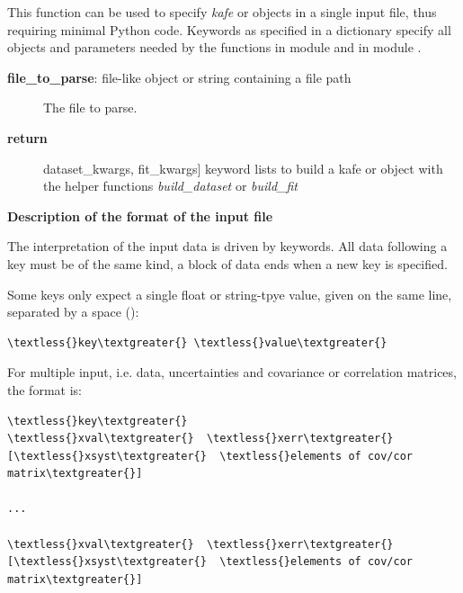 \documentclass[a4paper,10pt,english]{sphinxmanual}
\begin{document}
\begin{fulllineitems}
\label{index:kafe.file_tools.parse_general_inputfile}
This function can be used to specify \emph{kafe} 
or  objects in a single input file, thus requiring
minimal Python code. Keywords as specified in a dictionary
 specify all objects and parameters needed by the
functions  in  module {\hyperref[index:module-dataset]{}} and
 in module {\hyperref[index:module-fit]{}}.
\begin{description}
\item[{\textbf{file\_to\_parse}:  file-like object or string containing a file path}] \leavevmode
The file to parse.

\item[{\textbf{return}}] \leavevmode{[}dataset\_kwargs, fit\_kwargs{]}
keyword lists to build a kafe  or  object
with the helper functions \emph{build\_dataset} or \emph{build\_fit}

\end{description}

\textbf{Description of the format of the input file}

The interpretation of the input data is driven by keywords.
All data following a key must be of the same kind, a block of
data ends when a new key is specified.

Some keys only expect a single float or string-tpye value, given
on the same line, separated by a space ():

\begin{Verbatim}[commandchars=\\\{\}]
\textless{}key\textgreater{} \textless{}value\textgreater{}
\end{Verbatim}

For multiple input, i.e. data, uncertainties and covariance or
correlation matrices, the format is:

\begin{Verbatim}[commandchars=\\\{\}]
\textless{}key\textgreater{}
\textless{}xval\textgreater{}  \textless{}xerr\textgreater{}  [\textless{}xsyst\textgreater{}  \textless{}elements of cov/cor matrix\textgreater{}]

...

\textless{}xval\textgreater{}  \textless{}xerr\textgreater{}  [\textless{}xsyst\textgreater{}  \textless{}elements of cov/cor matrix\textgreater{}]
\end{Verbatim}


\end{fulllineitems}
\end{document}
